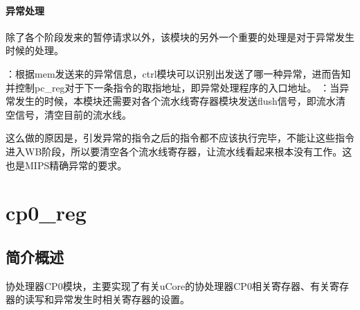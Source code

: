         \paragraph{异常处理}
        除了各个阶段发来的暂停请求以外，该模块的另外一个重要的处理是对于异常发生时候的处理。

        \begin{enumerate}
            ：根据mem发送来的异常信息，ctrl模块可以识别出发送了哪一种异常，进而告知并控制pc\_reg对于下一条指令的取指地址，即异常处理程序的入口地址。
            ：当异常发生的时候，本模块还需要对各个流水线寄存器模块发送flush信号，即流水清空信号，清空目前的流水线。

            这么做的原因是，引发异常的指令之后的指令都不应该执行完毕，不能让这些指令进入WB阶段，所以要清空各个流水线寄存器，让流水线看起来根本没有工作。这也是MIPS精确异常的要求。
        \end{enumerate}

\section{cp0\_reg}

    \subsection{简介概述}
    协处理器CP0模块，主要实现了有关uCore的协处理器CP0相关寄存器、有关寄存器的读写和异常发生时相关寄存器的设置。

